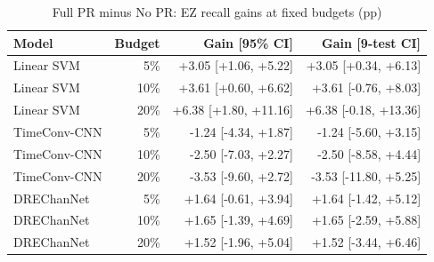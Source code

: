 \begin{table}[t]
\centering
\caption{Full PR minus No PR: EZ recall gains at fixed budgets (pp)}
\small
\begin{tabular}{lrrr}
\toprule
Model & Budget & Gain [95\% CI] & Gain [9-test CI] \\
\midrule
Linear SVM & 5\% & +3.05 [+1.06, +5.22] & +3.05 [+0.34, +6.13] \\
Linear SVM & 10\% & +3.61 [+0.60, +6.62] & +3.61 [-0.76, +8.03] \\
Linear SVM & 20\% & +6.38 [+1.80, +11.16] & +6.38 [-0.18, +13.36] \\
TimeConv-CNN & 5\% & -1.24 [-4.34, +1.87] & -1.24 [-5.60, +3.15] \\
TimeConv-CNN & 10\% & -2.50 [-7.03, +2.27] & -2.50 [-8.58, +4.44] \\
TimeConv-CNN & 20\% & -3.53 [-9.60, +2.72] & -3.53 [-11.80, +5.25] \\
DREChanNet & 5\% & +1.64 [-0.61, +3.94] & +1.64 [-1.42, +5.12] \\
DREChanNet & 10\% & +1.65 [-1.39, +4.69] & +1.65 [-2.59, +5.88] \\
DREChanNet & 20\% & +1.52 [-1.96, +5.04] & +1.52 [-3.44, +6.46] \\
\bottomrule
\end{tabular}
\end{table}
